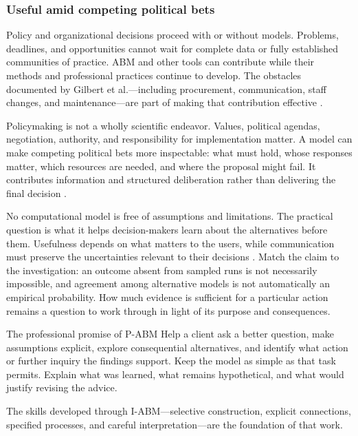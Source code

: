 \documentclass[11pt,a4paper]{article}
\begin{document}
\subsubsection{Useful amid competing political bets}

Policy and organizational decisions proceed with or without models. Problems, deadlines, and opportunities cannot wait for complete data or fully established communities of practice. ABM and other tools can contribute while their methods and professional practices continue to develop. The obstacles documented by Gilbert et al.---including procurement, communication, staff changes, and maintenance---are part of making that contribution effective \cite[paras.~2.12--2.13, 5.28--5.33]{gilbert_policy_2018}.

Policymaking is not a wholly scientific endeavor. Values, political agendas, negotiation, authority, and responsibility for implementation matter. A model can make competing political bets more inspectable: what must hold, whose responses matter, which resources are needed, and where the proposal might fail. It contributes information and structured deliberation rather than delivering the final decision \cite[para.~2.13]{gilbert_policy_2018}.

No computational model is free of assumptions and limitations. The practical question is what it helps decision-makers learn about the alternatives before them. Usefulness depends on what matters to the users, while communication must preserve the uncertainties relevant to their decisions \cite[paras.~1.5--1.7, 3.10]{polhill_prediction_2021}\cite[para.~5.26]{gilbert_policy_2018}. Match the claim to the investigation: an outcome absent from sampled runs is not necessarily impossible, and agreement among alternative models is not automatically an empirical probability. How much evidence is sufficient for a particular action remains a question to work through in light of its purpose and consequences.

\begin{principle}{The professional promise of P-ABM}
Help a client ask a better question, make assumptions explicit, explore consequential alternatives, and identify what action or further inquiry the findings support. Keep the model as simple as that task permits. Explain what was learned, what remains hypothetical, and what would justify revising the advice.

The skills developed through I-ABM---selective construction, explicit connections, specified processes, and careful interpretation---are the foundation of that work.
\end{principle}
\end{document}
